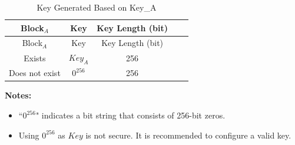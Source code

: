 \begin{longtable}[c]{ |c|c|c|c|c| }
\caption{Key Generated Based on Key\_A}
\label{tab:extmemencr-key-possibility}
\\\hline 
\rowcolor{lightgray}
Block$_A$ & Key  & Key Length (bit) \\\hline
\endfirsthead
\hline
\rowcolor{lightgray}
Block$_A$ & Key  & Key Length (bit) \\\hline
\endhead
\endfoot
Exists       &   $\mathit{Key}_{A}$    &   256   \\\hline
Does not exist        &   $0^{256}$    &   256   \\\hline
\end{longtable}
\vspace{-1.5em}
{\bfseries Notes: }\\
\begin{itemize}
    \item ``$0^{256}$" indicates a bit string that consists of 256-bit zeros. 
    \item Using $0^{256}$ as $\mathit{Key}$ is not secure. It is recommended to configure a valid key.
\end{itemize}
